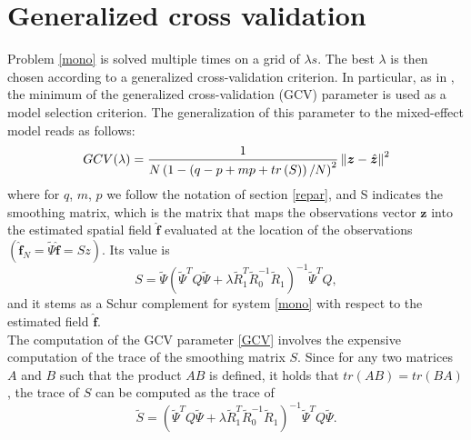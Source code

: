 \section{Generalized cross validation}
Problem \ref{mono} is solved multiple times on a grid of $\lambda s$. The best
$\lambda$ is then chosen according to a generalized cross-validation criterion.
In particular, as in \cite{sangalli1}, the minimum of the generalized
cross-validation (GCV) parameter is used as a model selection criterion. The
generalization of this parameter to the mixed-effect model reads as follows:
\begin{equation}
	\label{GCV}
	GCV(\lambda) = \frac{1}{N\left(1-\left(q-p+mp+tr\left(S\right)\right)/N\right)^2}\left\|\bm{z} - \hat{\bm{z}}\right\|^2
\end{equation}
where for $q$, $m$, $p$ we follow the notation of section
\ref{repar}, and S indicates the smoothing matrix, which is the matrix that
maps the observations vector $\bm{z}$ into the estimated spatial field
$\hat{\bm{f}}$ evaluated at the location of the observations $(\hat{\bm{f}}_N =
	\tilde{\Psi}\hat{\bm{f}} = S z)$. Its value is
\begin{equation}
	S = \tilde{\Psi} \left(\tilde{\Psi}^TQ\tilde{\Psi} + \lambda \tilde{R}_1^T
	\tilde{R}_0^{-1} \tilde{R}_1\right)^{-1}\tilde{\Psi}^TQ,
\end{equation}
and it stems as a Schur complement for system \ref{mono} with respect
to the estimated field $\hat{\bm{f}}$.\\ The computation of the GCV parameter
\ref{GCV} involves the expensive computation of the trace of the smoothing
matrix $S$. Since for any two matrices $A$ and $B$ such that the product $AB$
is defined, it holds that $tr\left(AB\right) = tr\left(BA\right)$, the trace of
$S$ can be computed as the trace of
\begin{equation}
	\tilde{S} = \left(\tilde{\Psi}^TQ\tilde{\Psi} + \lambda \tilde{R}_1^T
	\tilde{R}_0^{-1} \tilde{R}_1\right)^{-1}\tilde{\Psi}^TQ \tilde{\Psi}.
\end{equation}

